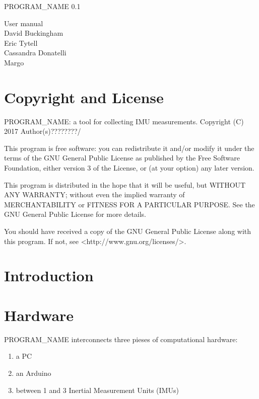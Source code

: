 \documentclass[11pt,letterpaper,article]{memoir}
\newcommand{\name}{PROGRAM_NAME}
\newcommand{\version}{0.1}
\begin{document}
\thispagestyle{empty}

{%
\centering
\Large

\vspace*{\fill}

{\huge
\name{} \version \\
}

{\LARGE
User manual \\
\vspace{2.5cm}
David Buckingham \\
Eric Tytell \\
Cassandra Donatelli \\
Margo \\
}
\vspace*{\fill}

}

\cleardoublepage

\tableofcontents*

\clearpage


\section{Copyright and License}

\name{}: a tool for collecting IMU measurements.
Copyright (C) 2017 Author(s)????????/

This program is free software: you can redistribute it and/or modify
it under the terms of the GNU General Public License as published by
the Free Software Foundation, either version 3 of the License, or
(at your option) any later version.

This program is distributed in the hope that it will be useful,
but WITHOUT ANY WARRANTY; without even the implied warranty of
MERCHANTABILITY or FITNESS FOR A PARTICULAR PURPOSE.  See the
GNU General Public License for more details.

You should have received a copy of the GNU General Public License
along with this program.  If not, see <http://www.gnu.org/licenses/>.

\section{Introduction}


\section{Hardware}

\name{} interconnects three pieses of computational hardware:
\begin{enumerate}
  \item a PC
  \item an Arduino
  \item between 1 and 3 Inertial Measurement Units (IMUs)
\end{enumerate}
\end{document}
